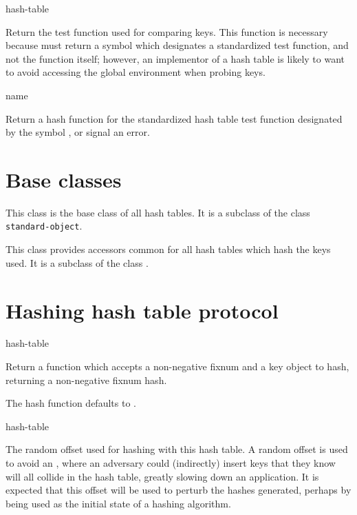  {hash-table}

Return the test function used for comparing keys. This function is necessary
because  must return a symbol which designates a
standardized test function, and not the function itself; however, an
implementor of a hash table is likely to want to avoid accessing the global
environment when probing keys.

 {name}

Return a hash function for the standardized hash table test function
designated by the symbol , or signal an error.

\section{Base classes}


This class is the base class of all hash tables.  It is a subclass of
the class \texttt{standard-object}.


This class provides accessors common for all hash tables which hash
the keys used.  It is a subclass of the class .

\section{Hashing hash table protocol}

 {hash-table}


Return a function which accepts a non-negative fixnum 
and a key object to hash, returning a non-negative fixnum hash.

The hash function defaults to
.

 {hash-table}


The random offset used for hashing with this hash table.  A random
offset is used to avoid an , where
an adversary could (indirectly) insert keys that they know will all
collide in the hash table, greatly slowing down an application.  It is
expected that this offset will be used to perturb the hashes
generated, perhaps by being used as the initial state of a hashing
algorithm.

